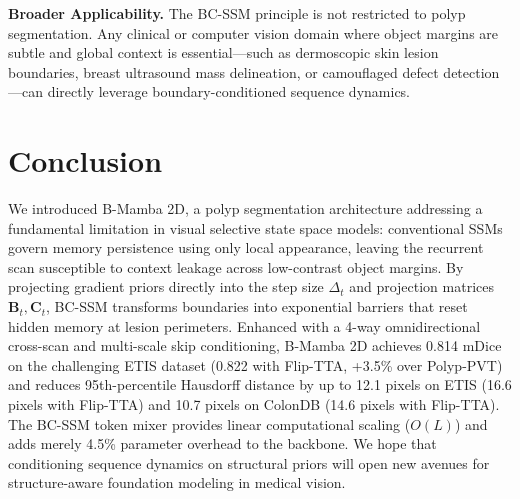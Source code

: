 \documentclass[journal]{IEEEtran}
\newcommand{\vect}[1]{\bm{#1}}
\begin{document}
\textbf{Broader Applicability.} The BC-SSM principle is not restricted to polyp segmentation. Any clinical or computer vision domain where object margins are subtle and global context is essential—such as dermoscopic skin lesion boundaries, breast ultrasound mass delineation, or camouflaged defect detection—can directly leverage boundary-conditioned sequence dynamics.

\section{Conclusion}
\label{sec:conclusion}
We introduced B-Mamba 2D, a polyp segmentation architecture addressing a fundamental limitation in visual selective state space models: conventional SSMs govern memory persistence using only local appearance, leaving the recurrent scan susceptible to context leakage across low-contrast object margins. By projecting gradient priors directly into the step size $\Delta_t$ and projection matrices $\vect{B}_t, \vect{C}_t$, BC-SSM transforms boundaries into exponential barriers that reset hidden memory at lesion perimeters. Enhanced with a 4-way omnidirectional cross-scan and multi-scale skip conditioning, B-Mamba 2D achieves 0.814 mDice on the challenging ETIS dataset (0.822 with Flip-TTA, +3.5\% over Polyp-PVT) and reduces 95th-percentile Hausdorff distance by up to 12.1 pixels on ETIS (16.6 pixels with Flip-TTA) and 10.7 pixels on ColonDB (14.6 pixels with Flip-TTA). The BC-SSM token mixer provides linear computational scaling ($O(L)$) and adds merely 4.5\% parameter overhead to the backbone. We hope that conditioning sequence dynamics on structural priors will open new avenues for structure-aware foundation modeling in medical vision.

\def\BIBdecl{%
  \setlength{\itemsep}{0.2pt plus 0.2pt}%
  \setlength{\parsep}{0pt}%
}


\end{document}
